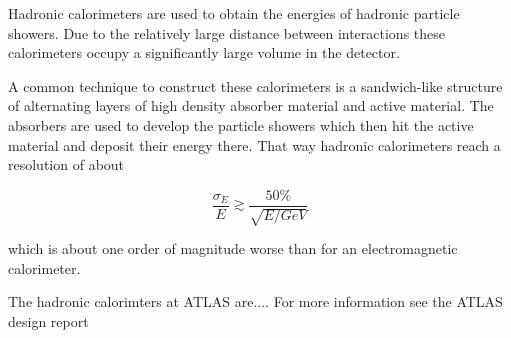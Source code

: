 Hadronic calorimeters are used to obtain the energies of hadronic particle showers.
Due to the relatively large distance between interactions these calorimeters occupy a significantly large volume in the detector.

A common technique to construct these calorimeters is a sandwich-like structure of alternating layers of high density absorber material and active material. 
The absorbers are used to develop the particle showers which then hit the active material and deposit their energy there. That way hadronic calorimeters reach a resolution of about

\begin{equation}
\frac{\sigma_E}{E} \gtrsim \frac{50 \%}{\sqrt{E/GeV}}
\end{equation}

which is about one order of magnitude worse than for an electromagnetic calorimeter.

The hadronic calorimters at ATLAS are....
For more information see the ATLAS design report \cite{atlastdr}

